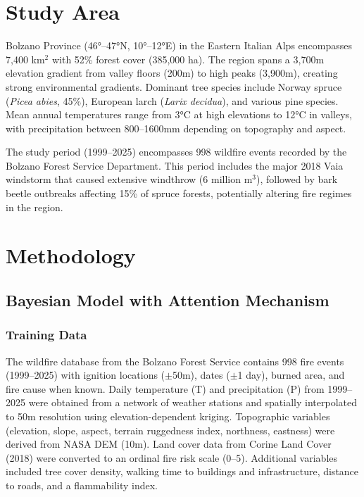 \documentclass[11pt,a4paper]{article}
\begin{document}
\section{Study Area}

Bolzano Province (46°--47°N, 10°--12°E) in the Eastern Italian Alps encompasses 7,400 km$^2$ with 52\% forest cover (385,000 ha). The region spans a 3,700m elevation gradient from valley floors (200m) to high peaks (3,900m), creating strong environmental gradients. Dominant tree species include Norway spruce (\textit{Picea abies}, 45\%), European larch (\textit{Larix decidua}), and various pine species. Mean annual temperatures range from 3°C at high elevations to 12°C in valleys, with precipitation between 800--1600mm depending on topography and aspect.

The study period (1999--2025) encompasses 998 wildfire events recorded by the Bolzano Forest Service Department. This period includes the major 2018 Vaia windstorm that caused extensive windthrow (6 million m$^3$), followed by bark beetle outbreaks affecting 15\% of spruce forests, potentially altering fire regimes in the region.

\section{Methodology}

\subsection{Bayesian Model with Attention Mechanism}

\subsubsection{Training Data}

The wildfire database from the Bolzano Forest Service contains 998 fire events (1999--2025) with ignition locations ($\pm$50m), dates ($\pm$1 day), burned area, and fire cause when known. Daily temperature (T) and precipitation (P) from 1999--2025 were obtained from a network of weather stations and spatially interpolated to 50m resolution using elevation-dependent kriging. Topographic variables (elevation, slope, aspect, terrain ruggedness index, northness, eastness) were derived from NASA DEM (10m). Land cover data from Corine Land Cover (2018) were converted to an ordinal fire risk scale (0--5). Additional variables included tree cover density, walking time to buildings and infrastructure, distance to roads, and a flammability index.
\end{document}
